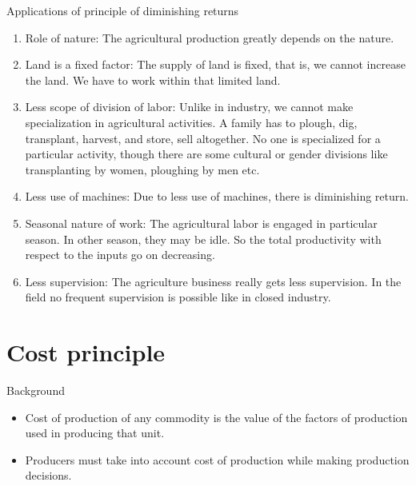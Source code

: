 \documentclass[12pt,ignorenonframetext,aspectratio=169]{beamer}
\providecommand{\tightlist}{%
  \setlength{\itemsep}{0pt}\setlength{\parskip}{0pt}}
\begin{document}
\begin{frame}{Applications of principle of diminishing returns}
\protect\hypertarget{applications-of-principle-of-diminishing-returns}{}
\footnotesize

\begin{enumerate}
\tightlist
\item
  Role of nature: The agricultural production greatly depends on the
  nature.
\item
  Land is a fixed factor: The supply of land is fixed, that is, we
  cannot increase the land. We have to work within that limited land.
\item
  Less scope of division of labor: Unlike in industry, we cannot make
  specialization in agricultural activities. A family has to plough,
  dig, transplant, harvest, and store, sell altogether. No one is
  specialized for a particular activity, though there are some cultural
  or gender divisions like transplanting by women, ploughing by men etc.
\item
  Less use of machines: Due to less use of machines, there is
  diminishing return.
\item
  Seasonal nature of work: The agricultural labor is engaged in
  particular season. In other season, they may be idle. So the total
  productivity with respect to the inputs go on decreasing.
\item
  Less supervision: The agriculture business really gets less
  supervision. In the field no frequent supervision is possible like in
  closed industry.
\end{enumerate}
\end{frame}

\hypertarget{cost-principle}{%
\section{Cost principle}\label{cost-principle}}

\begin{frame}{Background}
\protect\hypertarget{background-1}{}
\begin{itemize}
\tightlist
\item
  Cost of production of any commodity is the value of the factors of
  production used in producing that unit.
\item
  Producers must take into account cost of production while making
  production decisions.
\end{itemize}
\end{frame}
\end{document}
